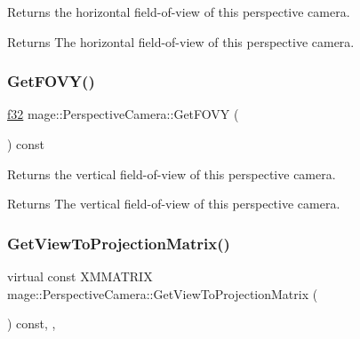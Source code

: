 Returns the horizontal field-\/of-\/view of this perspective camera.

\begin{DoxyReturn}{Returns}
The horizontal field-\/of-\/view of this perspective camera. 
\end{DoxyReturn}
\hypertarget{classmage_1_1_perspective_camera_aa1e80ee1b46ba8dcf50eb2fb0f6ddc16}{}\label{classmage_1_1_perspective_camera_aa1e80ee1b46ba8dcf50eb2fb0f6ddc16} 
\subsubsection{\texorpdfstring{Get\+F\+O\+V\+Y()}{GetFOVY()}}
{\footnotesize\ttfamily \hyperlink{namespacemage_a6a44ad388483959dc4dff9f2aef91431}{f32} mage\+::\+Perspective\+Camera\+::\+Get\+F\+O\+VY (\begin{DoxyParamCaption}{ }\end{DoxyParamCaption}) const\hspace{0.3cm}{\ttfamily [noexcept]}}

Returns the vertical field-\/of-\/view of this perspective camera.

\begin{DoxyReturn}{Returns}
The vertical field-\/of-\/view of this perspective camera. 
\end{DoxyReturn}
\hypertarget{classmage_1_1_perspective_camera_a5b733ac978a22dc58b04cf301899d575}{}\label{classmage_1_1_perspective_camera_a5b733ac978a22dc58b04cf301899d575} 
\subsubsection{\texorpdfstring{Get\+View\+To\+Projection\+Matrix()}{GetViewToProjectionMatrix()}}
{\footnotesize\ttfamily virtual const X\+M\+M\+A\+T\+R\+IX mage\+::\+Perspective\+Camera\+::\+Get\+View\+To\+Projection\+Matrix (\begin{DoxyParamCaption}{ }\end{DoxyParamCaption}) const\hspace{0.3cm}{\ttfamily [override]}, {\ttfamily [virtual]}, {\ttfamily [noexcept]}}

